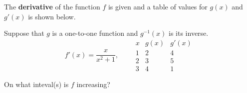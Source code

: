 \documentclass{ximera}
\author{Gregory Hartman \and Matthew Carr}
\begin{document}
\begin{exercise}



The \textbf{derivative} of the function $f$ is given and a table of values for $g(x)$ and $g'(x)$ is shown below.

Suppose that $g$ is a one-to-one function and $g^{-1}(x)$ is its inverse.
\[
f'(x)=\frac{x}{x^2+1},\qquad
\begin{array}{c|c|c}
x & g(x) & g'(x)\\ \hline
1 & 2 & 4\\ \hline
2 & 3 & 5\\ \hline
3 & 4 & 1
\end{array}
\]

On what inteval(s) is $f$ increasing?
\begin{prompt}
\begin{multipleChoice}
\end{multipleChoice}
\end{prompt}

\end{exercise}
\end{document}
